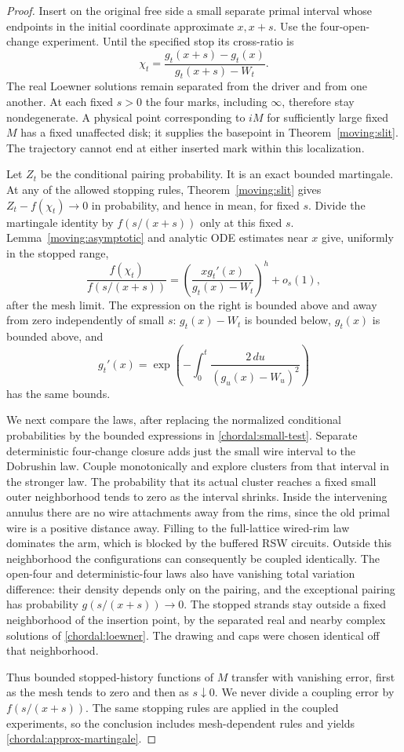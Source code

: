 \begin{proof}
Insert on the original free side a small separate primal interval
whose endpoints in the initial coordinate approximate $x,x+s$.
Use the four-open-change experiment.  Until the specified stop its
cross-ratio is
\[
 \chi_t=\frac{g_t(x+s)-g_t(x)}{g_t(x+s)-W_t}.
\]
The real Loewner solutions remain separated from the driver and
from one another.  At each fixed $s>0$ the four marks, including
$\infty$, therefore stay nondegenerate.  A physical point corresponding
to $iM$ for sufficiently large fixed $M$ has a fixed unaffected disk;
it supplies the basepoint in Theorem~\ref{moving:slit}.  The trajectory
cannot end at either inserted mark within this localization.

Let $Z_t$ be the conditional pairing probability.  It is an exact
bounded martingale.  At any of the allowed stopping rules,
Theorem~\ref{moving:slit} gives $Z_t-f(\chi_t)\to0$ in probability,
and hence in mean, for fixed $s$.  Divide the martingale identity by
$f(s/(x+s))$ only at this fixed $s$.  Lemma~\ref{moving:asymptotic}
and analytic ODE estimates near $x$ give, uniformly in the stopped
range,
\begin{equation}\label{chordal:small-test}
 \frac{f(\chi_t)}{f(s/(x+s))}
     =\left(\frac{xg_t'(x)}{g_t(x)-W_t}\right)^h+o_s(1),
\end{equation}
after the mesh limit.  The expression on the right is bounded above
and away from zero independently of small $s$:
$g_t(x)-W_t$ is bounded below, $g_t(x)$ is bounded above, and
\[
 g_t'(x)=\exp\left(-\int_0^t\frac{2\,du}{(g_u(x)-W_u)^2}\right)
\]
has the same bounds.

We next compare the laws, after replacing the normalized conditional
probabilities by the bounded expressions in
\eqref{chordal:small-test}.  Separate deterministic four-change
closure adds just the small wire interval to the Dobrushin law.
Couple monotonically and explore clusters from that interval in the
stronger law.  The probability that its actual cluster reaches a
fixed small outer neighborhood tends to zero as the interval shrinks.
Inside the intervening annulus there are no wire attachments away
from the rims, since the old primal wire is a positive distance away.
Filling to the full-lattice wired-rim law dominates the arm, which
is blocked by the buffered RSW circuits.  Outside this neighborhood
the configurations can consequently be coupled identically.
The open-four and deterministic-four laws also have vanishing total
variation difference: their density depends only on the pairing,
and the exceptional pairing has probability
$g(s/(x+s))\to0$.  The stopped strands stay outside a fixed
neighborhood of the insertion point, by the separated real and
nearby complex solutions of \eqref{chordal:loewner}.  The drawing and
caps were chosen identical off that neighborhood.

Thus bounded stopped-history functions of $M$ transfer with vanishing
error, first as the mesh tends to zero and then as $s\downarrow0$.
We never divide a coupling error by $f(s/(x+s))$.  The same stopping
rules are applied in the coupled experiments, so the conclusion
includes mesh-dependent rules and yields
\eqref{chordal:approx-martingale}.
\end{proof}

